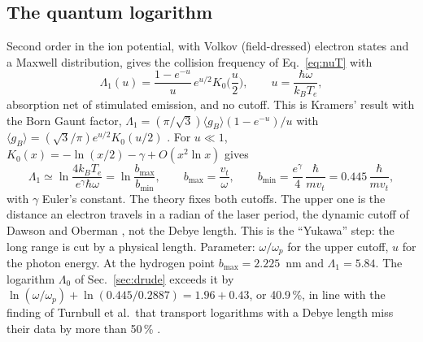 \documentclass[11pt]{article}
\numberwithin{equation}{section}
\newcommand{\kB}{k_B}
\begin{document}
\subsection{The quantum logarithm}
\label{sec:quantum}
Second order in the ion potential, with Volkov (field-dressed) electron states and a
Maxwell distribution, gives the collision frequency of Eq.~\eqref{eq:nuT} with
\begin{equation}
\Lambda_1(u)=\frac{1-e^{-u}}{u}\,e^{u/2}K_0\Big(\frac u2\Big),\qquad u=\frac{\hbar\omega}{\kB T_e},
\label{eq:Lam1}
\end{equation}
absorption net of stimulated emission, and no cutoff. This is Kramers' result with the
Born Gaunt factor, $\Lambda_1=(\pi/\sqrt3)\langle g_B\rangle(1-e^{-u})/u$ with
$\langle g_B\rangle=(\sqrt3/\pi)e^{u/2}K_0(u/2)$ \cite{Kramers1923,KarzasLatter1961}.
For $u\ll1$, $K_0(x)=-\ln(x/2)-\gamma+O(x^2\ln x)$ gives
\begin{equation}
\Lambda_1\simeq\ln\frac{4\kB T_e}{e^\gamma\hbar\omega}=\ln\frac{b_{\max}}{b_{\min}},\qquad
b_{\max}=\frac{v_t}{\omega},\qquad b_{\min}=\frac{e^\gamma}{4}\,\frac{\hbar}{mv_t}=0.445\,\frac{\hbar}{mv_t},
\label{eq:cutoffs}
\end{equation}
with $\gamma$ Euler's constant. The theory fixes both cutoffs. The upper one is the
distance an electron travels in a radian of the laser period, the dynamic cutoff of
Dawson and Oberman \cite{DawsonOberman1962}, not the Debye length. This is the
``Yukawa'' step: the long range is cut by a physical length. Parameter: $\omega/\omega_p$
for the upper cutoff, $u$ for the photon energy. At the hydrogen point
$b_{\max}=2.225$~nm and $\Lambda_1=5.84$. The logarithm $\Lambda_0$ of Sec.~\ref{sec:drude} exceeds it by $\ln(\omega/\omega_p)+\ln(0.445/0.2887)=1.96+0.43$,
or 40.9\,\%, in line with the finding of Turnbull et al.\ that transport logarithms with a
Debye length miss their data by more than 50\,\% \cite{Turnbull2023}.
\end{document}
